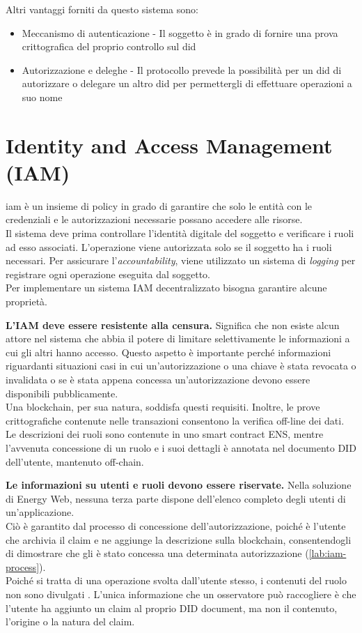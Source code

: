 Altri vantaggi forniti da questo sistema sono:
\begin{itemize}
    \item Meccanismo di autenticazione - Il soggetto è in grado di fornire una prova crittografica del proprio controllo sul \gls{did}
    \item Autorizzazione e deleghe -  Il protocollo prevede la possibilità per un \gls{did} di autorizzare o delegare un altro \gls{did} per permettergli di effettuare operazioni a suo nome
\end{itemize}

\section{Identity and Access Management (IAM)}
\label{sec:iam}

\gls{iam} è un insieme di policy in grado di garantire che solo le entità con le credenziali e le autorizzazioni necessarie possano accedere alle risorse. \\
Il sistema deve prima controllare l'identità digitale del soggetto e verificare i ruoli ad esso associati.
L'operazione viene autorizzata solo se il soggetto ha i ruoli necessari.
Per assicurare l'\textit{accountability}, viene utilizzato un sistema di \textit{logging} per registrare ogni operazione eseguita dal soggetto.\\

Per implementare un sistema IAM decentralizzato bisogna garantire alcune proprietà.

\textbf{L'IAM deve essere resistente alla censura.}
Significa che non esiste alcun attore nel sistema che abbia il potere di limitare selettivamente le informazioni a cui gli altri hanno accesso.
Questo aspetto è importante perché informazioni riguardanti situazioni casi in cui un'autorizzazione o una chiave è stata revocata o invalidata o se è stata appena concessa un'autorizzazione devono essere disponibili pubblicamente. \\
Una blockchain, per sua natura, soddisfa questi requisiti. Inoltre, le prove crittografiche contenute nelle transazioni consentono la verifica off-line dei dati.
Le descrizioni dei ruoli sono contenute in uno smart contract ENS, mentre l'avvenuta concessione di un ruolo e i suoi dettagli è annotata nel documento DID dell'utente, mantenuto off-chain.

\textbf{Le informazioni su utenti e ruoli devono essere riservate.}
Nella soluzione di Energy Web, nessuna terza parte dispone dell'elenco completo degli utenti di un'applicazione. \\
Ciò è garantito dal processo di concessione dell'autorizzazione, poiché è l'utente che archivia il claim e ne aggiunge la descrizione sulla blockchain, consentendogli di dimostrare che gli è stato concessa una determinata autorizzazione (\autoref{lab:iam-process}). \\
Poiché si tratta di una operazione svolta dall'utente stesso, i contenuti del ruolo non sono divulgati \cite{img:iam}.
L'unica informazione che un osservatore può raccogliere è che l'utente ha aggiunto un claim al proprio DID document, ma non il contenuto, l'origine o la natura del claim. \\


